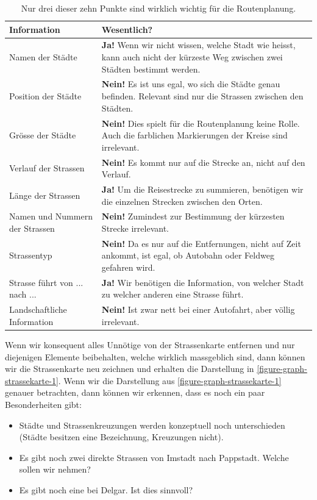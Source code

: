 \begin{table}[htb]
\centering
\begin{tabular}{|p{3.5cm}|p{10cm}|}
\hline
\textbf{Information} & \textbf{Wesentlich?} \\ \hline
Namen der Städte & \textbf{Ja!} Wenn wir nicht wissen, welche Stadt wie heisst, kann auch nicht der kürzeste Weg zwischen zwei Städten bestimmt werden. \\ \hline
Position der Städte & \textbf{Nein!} Es ist uns egal, wo sich die Städte genau befinden. Relevant sind nur die Strassen zwischen den Städten. \\ \hline
Grösse der Städte & \textbf{Nein!} Dies spielt für die Routenplanung keine Rolle. Auch die farblichen Markierungen der Kreise sind irrelevant. \\ \hline
Verlauf der Strassen & \textbf{Nein!} Es kommt nur auf die Strecke an, nicht auf den Verlauf. \\ \hline
Länge der Strassen & \textbf{Ja!} Um die Reisestrecke zu summieren, benötigen wir die einzelnen Strecken zwischen den Orten. \\ \hline
Namen und Nummern der Strassen & \textbf{Nein!} Zumindest zur Bestimmung der kürzesten Strecke irrelevant. \\ \hline
Strassentyp & \textbf{Nein!} Da es nur auf die Entfernungen, nicht auf Zeit ankommt, ist egal, ob Autobahn oder Feldweg gefahren wird.\\ \hline
Strasse führt von ... nach ... & \textbf{Ja!} Wir benötigen die Information, von welcher Stadt zu welcher anderen eine Strasse führt. \\ \hline
Landschaftliche Information & \textbf{Nein!} Ist zwar nett bei einer Autofahrt, aber völlig irrelevant. \\ \hline
\end{tabular}
\caption{Nur drei dieser zehn Punkte sind wirklich wichtig für die Routenplanung.}
\label{table-routenplanung-abstraktion}
\end{table}

Wenn wir konsequent alles Unnötige von der Strassenkarte entfernen und nur diejenigen Elemente beibehalten, welche wirklich massgeblich sind, dann können wir die Strassenkarte neu zeichnen und erhalten die Darstellung in \autoref{figure-graph-strassekarte-1}. Wenn wir die Darstellung aus \autoref{figure-graph-strassekarte-1} genauer betrachten, dann können wir erkennen, dass es noch ein paar Besonderheiten gibt:

\begin{itemize}
\item Städte und Strassenkreuzungen werden konzeptuell noch unterschieden (Städte besitzen eine Bezeichnung, Kreuzungen nicht).
\item Es gibt noch zwei direkte Strassen von Imstadt nach Pappstadt. Welche sollen wir nehmen?
\item Es gibt noch eine  bei Delgar. Ist dies sinnvoll?
\end{itemize}

